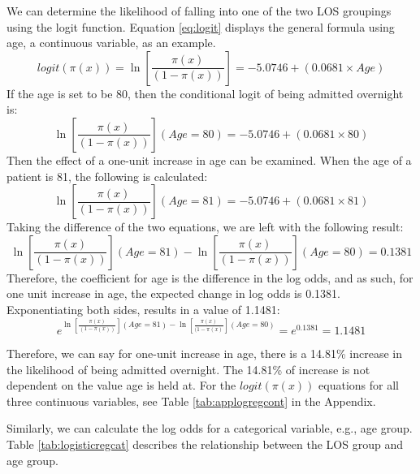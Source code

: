 \documentclass[../thesis.tex]{subfiles}
\begin{document}
We can determine the likelihood of falling into one of the two LOS groupings using the logit function. Equation \eqref{eq:logit} displays the general formula using age, a continuous variable, as an example.
\begin{equation}\label{eq:logit}
    logit(\pi(x)) = \ln\left[ \frac{\pi(x)}{(1-\pi(x))}\right] = -5.0746 + (0.0681\times Age)
\end{equation}
If the age is set to be 80, then the conditional logit of being admitted overnight is:
\begin{equation}
    \ln\left[\frac{\pi(x)}{(1-\pi(x))}\right](Age =80) = -5.0746 + (0.0681\times80 )
\end{equation}
Then the effect of a one-unit increase in age can be examined. When the age of a patient is 81, the following is calculated:
\begin{equation}
    \ln\left[\frac{\pi(x)}{(1-\pi(x))}\right](Age = 81) = -5.0746 + (0.0681\times81)
\end{equation}
Taking the difference of the two equations, we are left with the following result:
\begin{equation}
\ln\left[\frac{\pi(x)}{(1-\pi(x))}\right](Age =81) - \ln\left[\frac{\pi(x)}{(1-\pi(x))}\right](Age = 80) = 0.1381
\end{equation}
Therefore, the coefficient for age is the difference in the log odds, and as such, for one unit increase in age, the expected change in log odds is 0.1381. Exponentiating both sides, results in a value of 1.1481:
\begin{equation}
    e^{\ln\left[\frac{\pi(x)}{(1-\pi(x))}\right](Age =81) - \ln\left[\frac{\pi(x)}{(1-\pi(x)}\right](Age = 80)} = e^{0.1381} = 1.1481
\end{equation}

Therefore, we can say for one-unit increase in age, there is a 14.81\% increase in the likelihood of being admitted overnight. The 14.81\% of increase is not dependent on the value age is held at. For the $logit(\pi(x))$ equations for all three continuous variables, see Table \ref{tab:applogregcont} in the Appendix.

Similarly, we can calculate the log odds for a categorical variable, e.g., age group. Table \ref{tab:logisticregcat} describes the relationship between the LOS group and age group.
\end{document}
